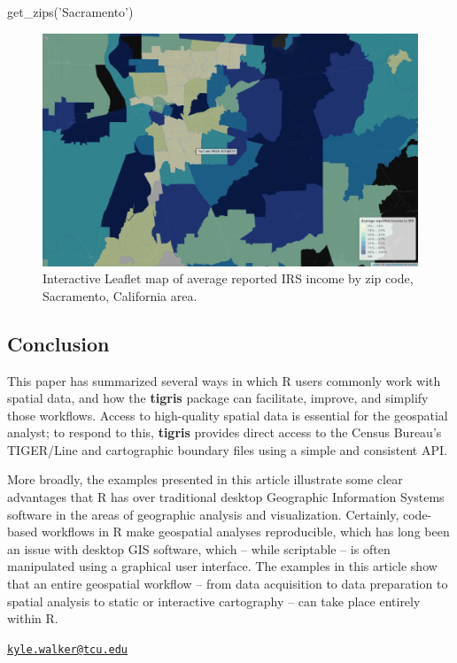 \begin{Schunk}
\begin{Sinput}
get_zips('Sacramento') %
\end{Sinput}
\end{Schunk}

\begin{figure}[htbp]
  \centering
  \includegraphics[width=\textwidth]{sacramento}
  \caption{Interactive Leaflet map of average reported IRS income by zip code, Sacramento, California area.}
  \label{figure:sacramento}
\end{figure}

\subsection{Conclusion}\label{conclusion}

This paper has summarized several ways in which R users commonly work
with spatial data, and how the \textbf{tigris} package can facilitate,
improve, and simplify those workflows. Access to high-quality spatial
data is essential for the geospatial analyst; to respond to this,
\textbf{tigris} provides direct access to the Census Bureau's TIGER/Line
and cartographic boundary files using a simple and consistent API.

More broadly, the examples presented in this article illustrate some
clear advantages that R has over traditional desktop Geographic
Information Systems software in the areas of geographic analysis and
visualization. Certainly, code-based workflows in R make geospatial
analyses reproducible, which has long been an issue with desktop GIS
software, which -- while scriptable -- is often manipulated using a
graphical user interface. The examples in this article show that an
entire geospatial workflow -- from data acquisition to data preparation
to spatial analysis to static or interactive cartography -- can take
place entirely within R.



\address{%
Kyle Walker\\
Texas Christian University\\
2850 S University Dr\\ Fort Worth, TX 76109\\
}
\href{mailto:kyle.walker@tcu.edu}{\nolinkurl{kyle.walker@tcu.edu}}

\address{%
Bob Rudis\\
\\
\\ \\
}



